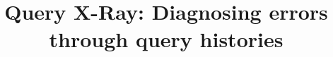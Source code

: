 



\newcommand{\alex}[1]{\noindent{\color{darkgreen}{Alexandra: #1}}}
\newcommand{\xlw}[1]{\noindent{\color{blue}{Xiaolan: #1}}}
\newcommand{\ewu}[1]{\noindent{\color{red}{EWu: #1}}}
\newcommand{\xxx}[1]{{\fontsize{13pt}{13pt}\selectfont\textcolor{red}{#1}}}
\newcommand{\codesize}{\fontsize{7}{8}}
\newcommand{\stitle}[1]{\vspace{0.5em}\noindent\textbf{#1}}
\newcommand{\calF}[0]{$\cal{F}$}

\newcommand{\ind}{\hspace{\algorithmicindent}}
\newcommand{\sys}{\textsc{QueryXRay}\xspace}

\newcommand{\deprecate}[1]{\noindent{\color{light-gray}{#1}}}

\newcommand{\prob}{{\sc Log-Corruption}\xspace}
\newcommand{\exact}{{\sc EXACTSOL}\xspace}
\newcommand{\qfix}{{\sc SingleQueryFix}\xspace}
\newcommand{\density}{{\sc DENSITY}\xspace}


\newcommand{\milpall}{\textsc{MILP-NAIVE}\xspace}
\newcommand{\milptuple}{\textsc{MILP-COMPL}\xspace}
\newcommand{\milptuplestopearly}{\textsc{MILP-COMPL-STOPEARLY}\xspace}
\newcommand{\milpadvtuple}{\textsc{MILP-ADV-TUPLE}\xspace}
\newcommand{\milpadvall}{\textsc{MILP-ADV-ALL}\xspace}
\newcommand{\heurstic}{\textsc{HEURISTIC}\xspace}




\title{Query X-Ray: Diagnosing errors through query histories}



